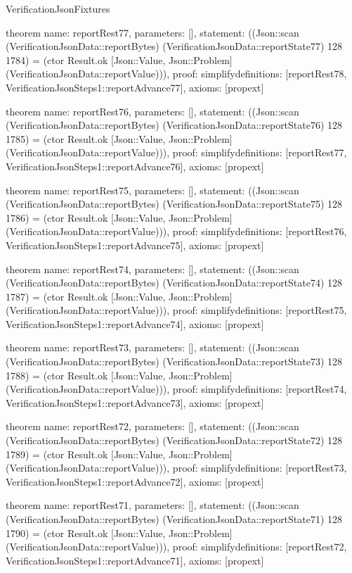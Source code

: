 \begin{lexlean}{VerificationJsonFixtures}
\begin{semanticmodule}
theorem{
  name: reportRest77,
  parameters: [],
  statement: ((Json::scan (VerificationJsonData::reportBytes) (VerificationJsonData::reportState77) 128 1784) = (ctor Result.ok [Json::Value, Json::Problem] (VerificationJsonData::reportValue))),
  proof: simplify{definitions: [reportRest78, VerificationJsonSteps1::reportAdvance77]},
  axioms: [propext]
}

theorem{
  name: reportRest76,
  parameters: [],
  statement: ((Json::scan (VerificationJsonData::reportBytes) (VerificationJsonData::reportState76) 128 1785) = (ctor Result.ok [Json::Value, Json::Problem] (VerificationJsonData::reportValue))),
  proof: simplify{definitions: [reportRest77, VerificationJsonSteps1::reportAdvance76]},
  axioms: [propext]
}

theorem{
  name: reportRest75,
  parameters: [],
  statement: ((Json::scan (VerificationJsonData::reportBytes) (VerificationJsonData::reportState75) 128 1786) = (ctor Result.ok [Json::Value, Json::Problem] (VerificationJsonData::reportValue))),
  proof: simplify{definitions: [reportRest76, VerificationJsonSteps1::reportAdvance75]},
  axioms: [propext]
}

theorem{
  name: reportRest74,
  parameters: [],
  statement: ((Json::scan (VerificationJsonData::reportBytes) (VerificationJsonData::reportState74) 128 1787) = (ctor Result.ok [Json::Value, Json::Problem] (VerificationJsonData::reportValue))),
  proof: simplify{definitions: [reportRest75, VerificationJsonSteps1::reportAdvance74]},
  axioms: [propext]
}

theorem{
  name: reportRest73,
  parameters: [],
  statement: ((Json::scan (VerificationJsonData::reportBytes) (VerificationJsonData::reportState73) 128 1788) = (ctor Result.ok [Json::Value, Json::Problem] (VerificationJsonData::reportValue))),
  proof: simplify{definitions: [reportRest74, VerificationJsonSteps1::reportAdvance73]},
  axioms: [propext]
}

theorem{
  name: reportRest72,
  parameters: [],
  statement: ((Json::scan (VerificationJsonData::reportBytes) (VerificationJsonData::reportState72) 128 1789) = (ctor Result.ok [Json::Value, Json::Problem] (VerificationJsonData::reportValue))),
  proof: simplify{definitions: [reportRest73, VerificationJsonSteps1::reportAdvance72]},
  axioms: [propext]
}

theorem{
  name: reportRest71,
  parameters: [],
  statement: ((Json::scan (VerificationJsonData::reportBytes) (VerificationJsonData::reportState71) 128 1790) = (ctor Result.ok [Json::Value, Json::Problem] (VerificationJsonData::reportValue))),
  proof: simplify{definitions: [reportRest72, VerificationJsonSteps1::reportAdvance71]},
  axioms: [propext]
}


\end{semanticmodule}
\end{lexlean}
